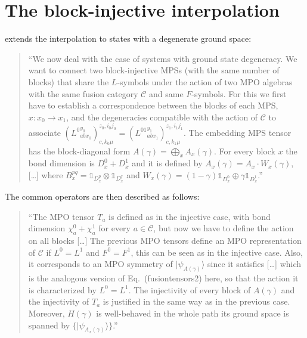 
\section{The block-injective interpolation}
\label{sec:mpo_block_mixed_path}

\cite[Section~5]{GarreRubio2023MPOSym} extends the interpolation to states
with a degenerate ground space:
\begin{quote}
    ``We now deal with the case of systems with ground state degeneracy. We
    want to connect two block-injective MPSs (with the same number of
    blocks) that share the $L$-symbols under the action of two MPO algebras
    with the same fusion category $\mathcal{C}$ and same $F$-symbols. For
    this we first have to establish a correspondence between the blocks of
    each MPS, $x:x_0 \to x_1$, and the degeneracies compatible with the
    action of $\mathcal{C}$ to associate
    $\left({L^0}_{abx_0}^{y_0} \right)_{c,k_0 \mu}^{z_0,i_0j_0} =
        \left({L^01}_{abx_1}^{y_1} \right)_{c,k_1 \mu}^{z_1,i_1j_1}$.
    The embedding MPS tensor has the block-diagonal form
    $A(\gamma)=\bigoplus_x A_x(\gamma)$. For every block $x$ the bond
    dimension is $D^0_x+D^1_x$ and it is defined by
    $A_x(\gamma)= A_x \cdot W_x(\gamma)$, [\ldots] where
    $B_x^{pq}= \mathbb{1}_{D^p_x}\otimes \mathbb{1}_{D_x^q}$ and
    $W_x(\gamma) = (1-\gamma)\mathbb{1}_{D_x^0}\oplus
        \gamma\mathbb{1}_{D_x^1}$.''
\end{quote}
The common operators are then described as follows:
\begin{quote}
    ``The MPO tensor $T_a$ is defined as in the injective case, with bond
    dimension $\chi^0_a + \chi^1_a$ for every $a \in \mathcal{C}$, but now we
    have to define the action on all blocks [\ldots] The previous MPO
    tensors define an MPO representation of $\mathcal{C}$ if $L^0=L^1$ and
    $F^0=F^1$, this can be seen as in the injective case. Also, it
    corresponds to an MPO symmetry of $|\psi_{A(\gamma)}\rangle$ since it
    satisfies [\ldots] which is the analogous version of
    Eq.~(fusiontensors2) here, so that the action it is characterized by
    $L^0 = L^1$. The injectivity of every block of $A(\gamma)$ and the
    injectivity of $T_a$ is justified in the same way as in the previous
    case. Moreover, $H(\gamma)$ is well-behaved in the whole path its ground
    space is spanned by $\{ |\psi_{A_x(\gamma)}\rangle\}$.''
\end{quote}

